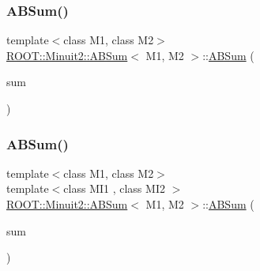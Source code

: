 \mbox{\label{classROOT_1_1Minuit2_1_1ABSum_ae687b46f660f6db5ca9c4626fd5e5a4b}} 
\subsubsection{\texorpdfstring{ABSum()}{ABSum()}\hspace{0.1cm}{\footnotesize\ttfamily [2/6]}}
{\footnotesize\ttfamily template$<$class M1, class M2$>$ \\
\mbox{\hyperlink{classROOT_1_1Minuit2_1_1ABSum}{R\+O\+O\+T\+::\+Minuit2\+::\+A\+B\+Sum}}$<$ M1, M2 $>$\+::\mbox{\hyperlink{classROOT_1_1Minuit2_1_1ABSum}{A\+B\+Sum}} (\begin{DoxyParamCaption}\item[{const \mbox{\hyperlink{classROOT_1_1Minuit2_1_1ABSum}{A\+B\+Sum}}$<$ M1, M2 $>$ \&}]{sum }\end{DoxyParamCaption})\hspace{0.3cm}{\ttfamily [inline]}}

\mbox{\label{classROOT_1_1Minuit2_1_1ABSum_a4f9776ad68bfb91ccf613b367ecf6730}} 
\subsubsection{\texorpdfstring{ABSum()}{ABSum()}\hspace{0.1cm}{\footnotesize\ttfamily [3/6]}}
{\footnotesize\ttfamily template$<$class M1, class M2$>$ \\
template$<$class M\+I1 , class M\+I2 $>$ \\
\mbox{\hyperlink{classROOT_1_1Minuit2_1_1ABSum}{R\+O\+O\+T\+::\+Minuit2\+::\+A\+B\+Sum}}$<$ M1, M2 $>$\+::\mbox{\hyperlink{classROOT_1_1Minuit2_1_1ABSum}{A\+B\+Sum}} (\begin{DoxyParamCaption}\item[{const \mbox{\hyperlink{classROOT_1_1Minuit2_1_1ABSum}{A\+B\+Sum}}$<$ M\+I1, M\+I2 $>$ \&}]{sum }\end{DoxyParamCaption})\hspace{0.3cm}{\ttfamily [inline]}}


